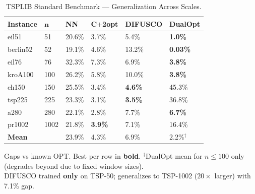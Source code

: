 \documentclass[10pt]{article}
\begin{document}
\begin{table}[h]
\centering
\caption{TSPLIB Standard Benchmark — Generalization Across Scales.}
\label{tab:tsplib}
\small
\begin{tabular}{@{}llllll@{}}
\toprule
\textbf{Instance} & $\boldsymbol{n}$ & \textbf{NN} & \textbf{C$+$2opt} & \textbf{DIFUSCO} & \textbf{DualOpt} \\
\midrule
eil51    & 51   & 20.6\% & 3.7\%  & 5.4\%  & \textbf{1.0\%} \\
berlin52 & 52   & 19.1\% & 4.6\%  & 13.2\% & \textbf{0.03\%} \\
eil76    & 76   & 32.3\% & 7.3\%  & 6.9\%  & \textbf{3.8\%} \\
kroA100  & 100  & 26.2\% & 5.8\%  & 10.0\% & \textbf{3.8\%} \\
ch150    & 150  & 25.5\% & 3.4\%  & \textbf{4.6\%}  & 45.3\% \\
tsp225   & 225  & 23.3\% & 3.1\%  & \textbf{3.5\%}  & 36.8\% \\
a280     & 280  & 22.1\% & 2.8\%  & 7.7\%  & \textbf{6.7\%} \\
pr1002   & 1002 & 21.8\% & \textbf{3.9\%}  & 7.1\%  & 16.4\% \\
\midrule
\textbf{Mean} & & 23.9\% & 4.3\% & 6.9\% & 2.2\%$^\dagger$ \\
\bottomrule
\end{tabular}

\vspace{2pt}
{\footnotesize Gaps vs known OPT. Best per row in \textbf{bold}. $^\dagger$DualOpt mean for $n\le100$ only (degrades beyond due to fixed window sizes).}\\
{\footnotesize DIFUSCO trained \textbf{only} on TSP-50; generalizes to TSP-1002 ($20\times$ larger) with 7.1\% gap.}
\end{table}
\end{document}
